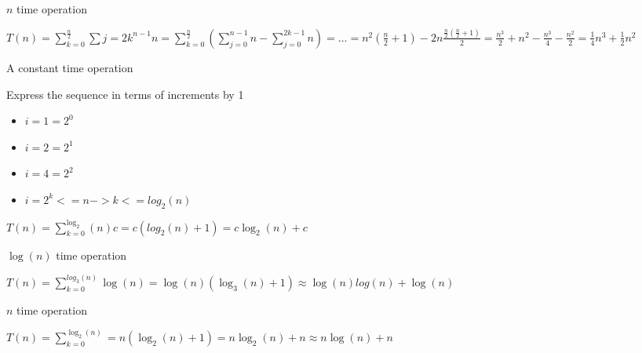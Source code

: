 \begin{multicols}{2}
  \noindent \hrulefill
  \begin{algorithmic}[1]
    \State $n$ time operation
    \EndFor
    \EndFor
  \end{algorithmic}
  \noindent \hrulefill

  $T(n) = \sum_{k=0}^{\frac{n}{2}} \sum{j=2k}^{n-1} n = \sum_{k=0}^{\frac{n}{2}} (\sum_{j=0}^{n-1} n - \sum_{j=0}^{2k-1} n) = ... = n^2(\frac{n}{2} + 1) - 2n \frac{\frac{n}{2} (\frac{n}{2} + 1)}{2} = \frac{n^3}{2} + n^2 - \frac{n^3}{4} - \frac{n^2}{2} = \frac{1}{4} n^3 + \frac{1}{2} n^2$

  \columnbreak

  \noindent \hrulefill
  \begin{algorithmic}[1]
    \State A constant time operation
    \EndFor
  \end{algorithmic}
  \noindent \hrulefill

  Express the sequence in terms of increments by 1
  \begin{itemize}
    \item $i = 1 = 2^0$
    \item $i = 2 = 2^1$
    \item $i = 4 = 2^2$
    \item $i = 2^k <= n -> k <= log_{2} (n)$
  \end{itemize}

  $T(n) = \sum_{k=0}^{\log_{2}} (n) c = c(log_{2} (n) + 1) = c \log_{2} (n) + c$
\end{multicols}

\begin{multicols}{2}
  \noindent \hrulefill
  \begin{algorithmic}[1]
    \State $\log (n)$ time operation
    \EndFor
  \end{algorithmic}
  \noindent \hrulefill

  $T(n) = \sum_{k=0}^{log_{3} (n)} \log (n) = \log (n) (\log_{3} (n) + 1) \approx \log (n) log (n) + \log (n)$

  \columnbreak

  \noindent \hrulefill
  \begin{algorithmic}[1]
    \State $n$ time operation
    \EndFor
  \end{algorithmic}
  \noindent \hrulefill

  $T(n) = \sum_{k=0}^{\log_{2} (n)} = n(\log_{2} (n) + 1) = n \log_{2} (n) + n \approx n \log (n) + n$
\end{multicols}

